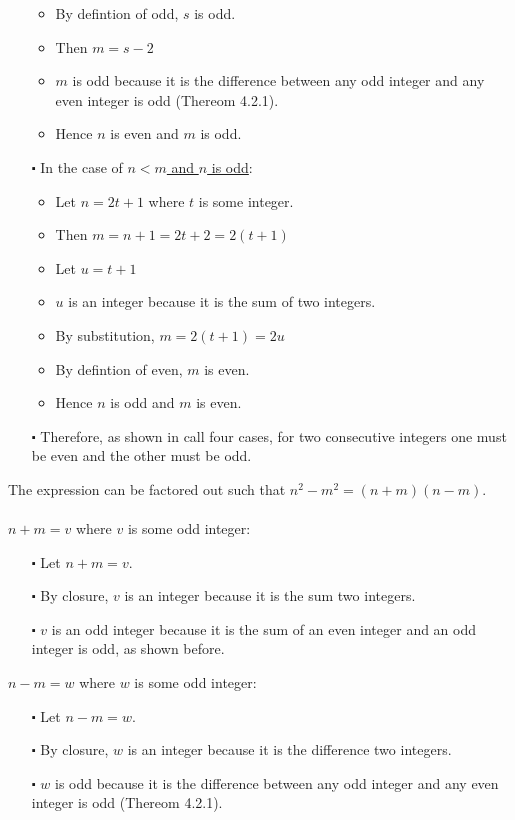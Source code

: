 \documentclass[12pt]{article}
\begin{document}
\begin{itemize}
\begin{itemize}
    \item  By defintion of odd, $s$ is odd.
    \item  Then $m =s-2$
    \item  $m$ is odd because it is the difference between any odd integer and any even integer is odd (Thereom 4.2.1).
    \item  Hence $n$ is even and $m$ is odd.
  \end{itemize}
  \item [$\centerdot$] In the case of \underline{$n<m$ and $n$ is odd}:
  \begin{itemize}
    \item Let $n = 2t+1$ where $t$ is some integer.
    \item Then $m = n+1 = 2t+2 = 2(t+1)$
    \item Let $u=t+1$
    \item $u$ is an integer because it is the sum of two integers.
    \item By substitution, $m = 2(t+1) = 2u$
    \item By defintion of even, $m$ is even.
    \item Hence $n$ is odd and $m$ is even.
  \end{itemize}
  \item [$\centerdot$] Therefore, as shown in call four cases, for two consecutive integers one must be even and the other must be odd.
\end{itemize}
The expression can be factored out such that $n^2 - m^2 = (n+m)(n-m)$. 
\\ \\
\newblock
$n+m = v$ where $v$ is some odd integer:
\begin{itemize}
  \item [$\centerdot$] Let $n+m = v$.
  \item [$\centerdot$] By closure, $v$ is an integer because it is the sum two integers.
  \item [$\centerdot$] $v$ is an odd integer because it is the sum of an even integer and an odd integer is odd, as shown before.
\end{itemize} 
\newblock
$n-m = w$ where $w$ is some odd integer:
\begin{itemize}
  \item [$\centerdot$] Let $n-m = w$.
  \item [$\centerdot$] By closure, $w$ is an integer because it is the difference two integers.
  \item [$\centerdot$] $w$ is odd because it is the difference between any odd integer and any even integer is odd (Thereom 4.2.1).


\end{itemize} 
\end{document}
